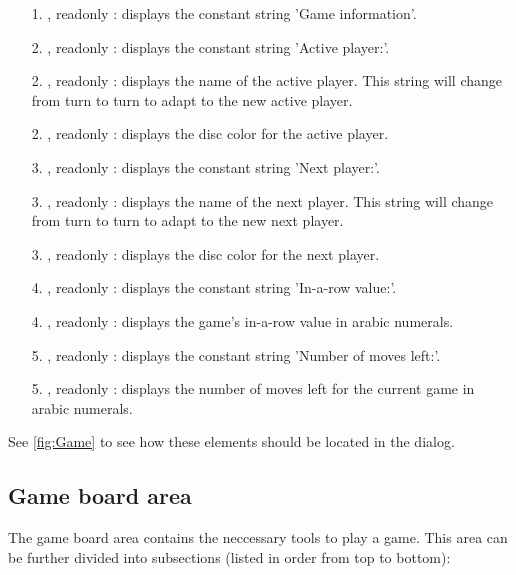   \begin{enumerate}
    \item[1.] , readonly : displays the constant string
                                        'Game information'.
    \item[2.] ,   readonly : displays the constant string
                                        'Active player:'.
    \item[2.] ,   readonly : displays the name of the active
                                        player. This string will change
                                        from turn to turn to adapt to
                                        the new active player.
    \item[2.] ,   readonly : displays the disc color for the
                                        active player.
    \item[3.] ,   readonly : displays the constant string
                                        'Next player:'.
    \item[3.] ,   readonly : displays the name of the next
                                        player. This string will change
                                        from turn to turn to adapt to
                                        the new next player.
    \item[3.] ,   readonly : displays the disc color for the
                                        next player.
    \item[4.] ,   readonly : displays the constant string
                                        'In-a-row value:'.
    \item[4.] ,   readonly : displays the game's in-a-row value
                                        in arabic numerals.
    \item[5.] ,   readonly : displays the constant string
                                        'Number of moves left:'.
    \item[5.] ,   readonly : displays the number of moves left
                                        for the current game in arabic
                                        numerals.
  \end{enumerate}

  \noindent See \cref{fig:Game} to see how these elements should be located in
  the dialog.


  \subsection{Game board area}
  The game board area contains the neccessary tools to play a 
  game. This area can be further divided into subsections (listed in order
  from top to bottom):

